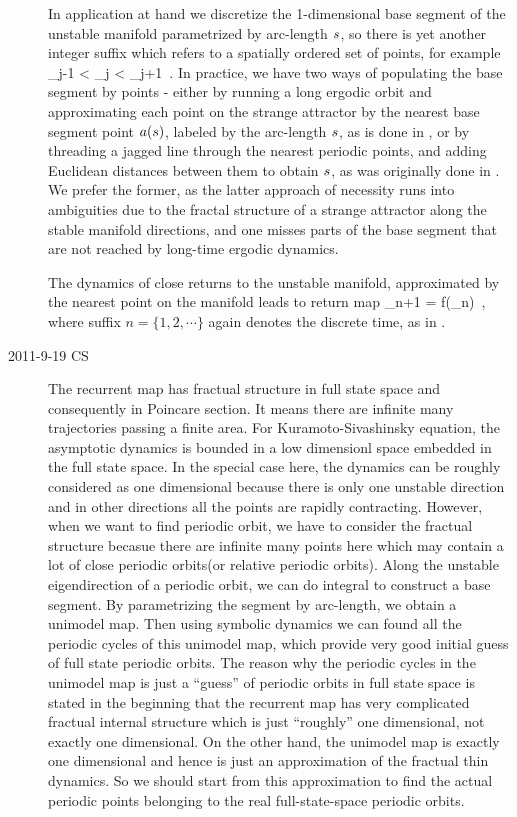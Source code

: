 \begin{description}
In application at hand we discretize the 1-dimensional base segment of
the unstable manifold parametrized by arc-length $s$, so there is yet
another integer suffix which refers to a spatially ordered set of points,
for example
\beq
\arc_{j-1} < \arc_{j} < \arc_{j+1}
\,.
In practice, we have two ways of populating the base segment by points -
either by running a long ergodic orbit and approximating each point on
the strange attractor by the nearest base segment point $a(s)$,
labeled by the arc-length $s$, as is done in , or by
threading a jagged line through the nearest periodic points, and adding
Euclidean distances between them to obtain $s$, as was originally done in
. We prefer the former, as the latter approach of
necessity runs into ambiguities due to the fractal structure of a strange
attractor along the stable manifold directions, and one misses parts of
the base segment that are not reached by long-time ergodic dynamics.

The dynamics of close returns to the unstable manifold, approximated by
the nearest point on the manifold leads to return map
\beq
\arc_{n+1} = {f}(\arc_n)
\,,
where suffix $n=\{1,2,\cdots\}$ again denotes the discrete time, as in
.

\item[2011-9-19 CS]
The recurrent map has fractual structure in full state space and consequently in Poincare section. It means there are infinite many trajectories passing a finite area. For Kuramoto-Sivashinsky equation, the asymptotic dynamics is bounded in a low dimensionl space embedded in the full state space. In the special case here, the dynamics can be roughly considered as one dimensional because there is only one unstable direction and in other directions all the points are rapidly contracting. However, when we want to find periodic orbit, we have to consider the fractual structure becasue there are infinite many points here which may contain a lot of close periodic orbits(or relative periodic orbits).  Along the unstable eigendirection of a periodic orbit, we can do integral to construct a base segment. By parametrizing the segment by arc-length, we obtain a unimodel map. Then using symbolic dynamics we can found all the periodic cycles of this unimodel map, which provide very good initial guess of full state periodic orbits. The reason why the periodic cycles in the unimodel map is just a ``guess'' of periodic orbits in full state space is stated in the beginning that the recurrent map has very complicated fractual internal structure which is just ``roughly'' one dimensional, not exactly one dimensional. On the other hand, the unimodel map is exactly one dimensional and hence is just an approximation of the fractual thin dynamics. So we should start from this approximation to find the actual periodic points belonging to the real full-state-space periodic orbits.


\end{description}
